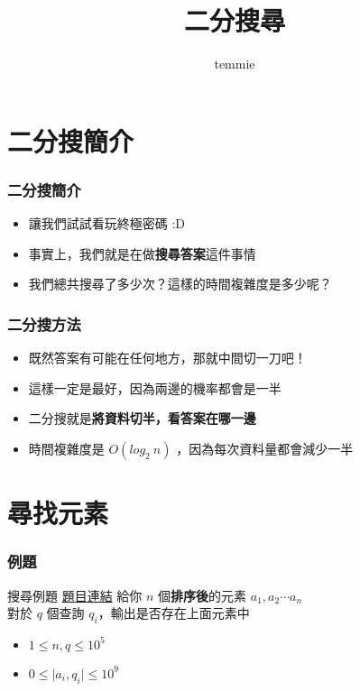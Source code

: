 \documentclass[mathserif]{beamer}
\title{二分搜尋}
\author{temmie}
\date{}
\begin{document}
\begin{frame}
    \titlepage
\end{frame}

\begin{frame}
    \tableofcontents
\end{frame}

\section{二分搜簡介}

\begin{frame}
    \frametitle{二分搜簡介}
    \begin{itemize}
        \item 讓我們試試看玩終極密碼 :D
        \item<2-> 事實上，我們就是在做\textbf{搜尋答案}這件事情
        \item<2-> 我們總共搜尋了多少次？這樣的時間複雜度是多少呢？
    \end{itemize}
\end{frame}

\begin{frame}
    \frametitle{二分搜方法}
    \begin{itemize}
        \item 既然答案有可能在任何地方，那就中間切一刀吧！
        \item 這樣一定是最好，因為兩邊的機率都會是一半
        \item 二分搜就是\textbf{將資料切半，看答案在哪一邊}
        \item 時間複雜度是 $O(log_2\ n)$ ，因為每次資料量都會減少一半
    \end{itemize}

\end{frame}

\section{尋找元素}

\begin{frame}
    \frametitle{例題}
    \begin{block}{搜尋例題}
        \href{https://codeforces.com/edu/course/2/lesson/6/1/practice/contest/283911/problem/A}{題目連結}
        給你 $n$ 個\textbf{排序後}的元素 $a_1, a_2 \cdots a_n$\\
        對於 $q$ 個查詢 $q_i$，輸出是否存在上面元素中
        \vspace{0.5cm}
        \begin{itemize}
            \item $1 \leq n, q \leq 10^5$
            \item $0 \leq \mid a_i, q_i \mid \leq 10^9$
        \end{itemize}
    \end{block}
\end{frame}
\end{document}
